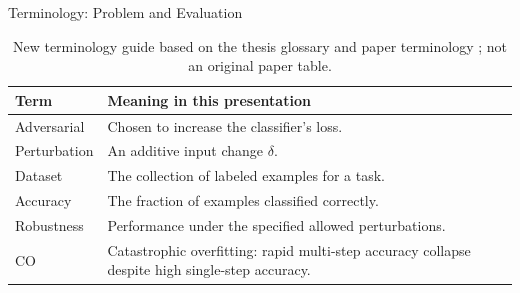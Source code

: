 \documentclass[11pt,aspectratio=169,professionalfonts]{beamer}
\begin{document}
\begin{frame}{Terminology: Problem and Evaluation}
\begin{table}
\centering\fontsize{11}{14}\selectfont\renewcommand{\arraystretch}{1.15}
\begin{tabular}{p{.24\linewidth}>{\raggedright\arraybackslash}p{.64\linewidth}}
\toprule
Term & Meaning in this presentation\\\midrule
Adversarial & Chosen to increase the classifier's loss.\\
Perturbation & An additive input change $\delta$.\\
Dataset & The collection of labeled examples for a task.\\
Accuracy & The fraction of examples classified correctly.\\
Robustness & Performance under the specified allowed perturbations.\\
CO & Catastrophic overfitting: rapid multi-step accuracy collapse despite high single-step accuracy.\\
\bottomrule
\end{tabular}
\caption{New terminology guide based on the thesis glossary and paper terminology \cite{sora2026}; not an original paper table.}
\end{table}
\end{frame}
\end{document}
